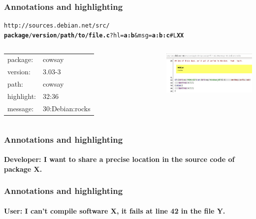 \documentclass{beamer}
\begin{document}
\begin{frame}
  \frametitle{Annotations and highlighting}
  \texttt{http://sources.debian.net/src/\\
    \textbf{package}/\textbf{version}/\textbf{path/to/file.c}?hl=\textbf{a:b}\&msg=\textbf{a:b:c}\#L\textbf{XX}}
  \vspace{1cm}
  \begin{columns}
    \begin{tabular}{ l l }
      package: & cowsay\\
      version: & 3.03-3\\
      path: & cowsay\\
      highlight: & 32:36\\
      message: & 30:Debian:rocks
    \end{tabular}
    \includegraphics[width=7.5cm]{img/screenshot-hl.png}
  \end{columns}
\end{frame}

\begin{frame}
  \frametitle{Annotations and highlighting}
  \framesubtitle{\alert{Developer}: I want to share a precise
    location in the source code of package X.}
\end{frame}

\begin{frame}
  \frametitle{Annotations and highlighting}
  \framesubtitle{\alert{User}: I can't compile software X, it fails
    at line 42 in the file Y.}
\end{frame}
\end{document}
